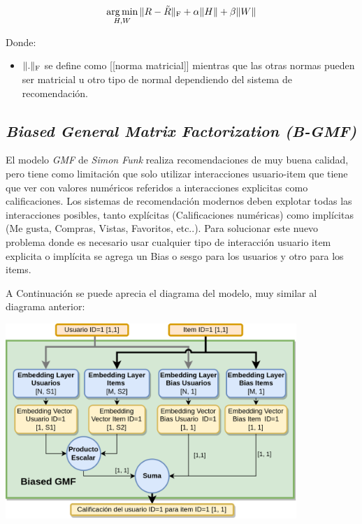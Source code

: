 \documentclass[11pt,a4paper,twoside]{thesis}
\begin{document}
\begin{equation}
\underset{H, W}{\operatorname{arg\,min}}\, \|R - \tilde{R}\|_{\rm F} + \alpha\|H\| + \beta\|W\|
\end{equation}
\begin{description}
\item[Donde:]
\end{description}
\begin{itemize}
\item $\|.\|_{\rm F}$ se define como [[norma matricial]] mientras que las otras normas pueden ser matricial u otro tipo de normal dependiendo del sistema de recomendación.
\end{itemize}

\subsection{\textit{Biased General Matrix Factorization (B-GMF)}}

El modelo \textit{GMF} de \textit{Simon Funk} realiza recomendaciones de muy buena calidad, pero tiene como limitación que solo utilizar interacciones usuario-item que tiene que ver con valores numéricos referidos a interacciones explicitas como calificaciones. Los sistemas de recomendación modernos deben explotar todas las interacciones posibles, tanto explícitas (Calificaciones numéricas) como implícitas (Me gusta, Compras, Vistas, Favoritos, etc..). Para solucionar este nuevo problema donde es necesario usar cualquier tipo de interacción usuario item explicita o implícita se agrega un Bias o sesgo para los usuarios y otro para los items.

A Continuación se puede aprecia el diagrama del modelo, muy similar al diagrama anterior:

\begin{center}
	\includegraphics[width=11cm]{./images/Biased-GMF.png}
\end{center}
\end{document}
